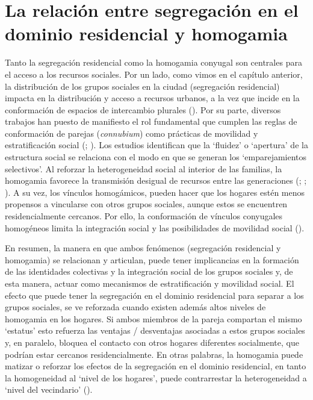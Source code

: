 \documentclass[
  spanish,
  a4paper,%
  chapterprefix=true,%
  DIV=calc,%
  twoside]{scrbook}%
\begin{document}
\section{La relación entre segregación en el dominio residencial y homogamia}\label{homogamy-lit}

Tanto la segregación residencial como la homogamia conyugal son
centrales para el acceso a los recursos sociales. Por un lado, como
vimos en el capítulo anterior, la distribución de los grupos sociales en
la ciudad (segregación residencial) impacta en la distribución y acceso
a recursos urbanos, a la vez que incide en la conformación de espacios
de intercambio plurales (). Por su parte, diversos
trabajos han puesto de manifiesto el rol fundamental que cumplen las
reglas de conformación de parejas (\emph{connubium}) como prácticas de
movilidad y estratificación social (; ). Los
estudios identifican que la `fluidez' o `apertura' de la estructura
social se relaciona con el modo en que se generan los `emparejamientos
selectivos'. Al reforzar la heterogeneidad social al interior de las
familias, la homogamia favorece la transmisión desigual de recursos
entre las generaciones (; ; ). A
su vez, los vínculos homogámicos, pueden hacer que los hogares estén
menos propensos a vincularse con otros grupos sociales, aunque estos se
encuentren residencialmente cercanos. Por ello, la conformación de
vínculos conyugales homogéneos limita la integración social y las
posibilidades de movilidad social ().

En resumen, la manera en que ambos fenómenos (segregación residencial y
homogamia) se relacionan y articulan, puede tener implicancias en la
formación de las identidades colectivas y la integración social de los
grupos sociales y, de esta manera, actuar como mecanismos de
estratificación y movilidad social. El efecto que puede tener la
segregación en el dominio residencial para separar a los grupos
sociales, se ve reforzada cuando existen además altos niveles de
homogamia en los hogares. Si ambos miembros de la pareja compartan el
mismo `estatus' esto refuerza las ventajas / desventajas asociadas a
estos grupos sociales y, en paralelo, bloquea el contacto con otros
hogares diferentes socialmente, que podrían estar cercanos
residencialmente. En otras palabras, la homogamia puede matizar o
reforzar los efectos de la segregación en el dominio residencial, en
tanto la homogeneidad al `nivel de los hogares', puede contrarrestar la
heterogeneidad a `nivel del vecindario' ().
\end{document}
